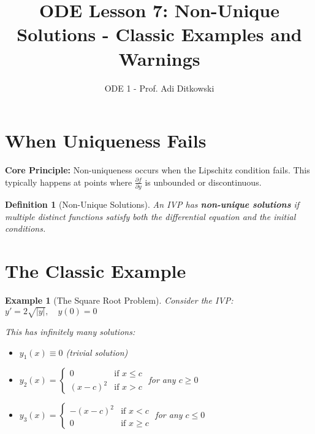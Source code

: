 \documentclass[12pt]{article}
\title{ODE Lesson 7: Non-Unique Solutions - Classic Examples and Warnings}
\author{ODE 1 - Prof. Adi Ditkowski}
\date{}
\newtheorem{definition}{Definition}
\newtheorem{example}{Example}
\begin{document}
\maketitle

\section{When Uniqueness Fails}

\begin{keypoint}
\textbf{Core Principle:} Non-uniqueness occurs when the Lipschitz condition fails. This typically happens at points where $\frac{\partial f}{\partial y}$ is unbounded or discontinuous.
\end{keypoint}

\begin{definition}[Non-Unique Solutions]
An IVP has \textbf{non-unique solutions} if multiple distinct functions satisfy both the differential equation and the initial conditions.
\end{definition}

\section{The Classic Example}

\begin{example}[The Square Root Problem]
Consider the IVP:
$y' = 2\sqrt{|y|}, \quad y(0) = 0$

This has infinitely many solutions:
\begin{itemize}
    \item $y_1(x) \equiv 0$ (trivial solution)
    \item $y_2(x) = \begin{cases}
        0 & \text{if } x \leq c \\
        (x-c)^2 & \text{if } x > c
    \end{cases}$ for any $c \geq 0$
    \item $y_3(x) = \begin{cases}
        -(x-c)^2 & \text{if } x < c \\
        0 & \text{if } x \geq c
    \end{cases}$ for any $c \leq 0$
\end{itemize}
\end{example}
\end{document}
